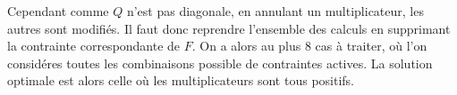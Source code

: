 Cependant comme $Q$ n'est pas diagonale, en annulant un multiplicateur, les autres sont modifiés.  Il faut donc reprendre l'ensemble des calculs en supprimant la contrainte correspondante de $F$. On a alors au plus 8 cas à traiter, où l'on considéres toutes les combinaisons possible de contraintes actives. La solution optimale est alors celle où les multiplicateurs sont tous positifs.




